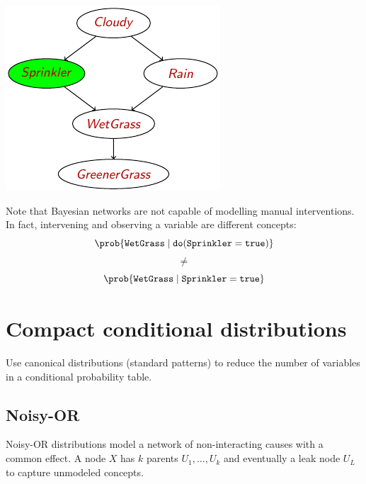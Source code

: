 \begin{description}
\begin{example}
            \begin{minipage}{.3\linewidth}
                \centering
                \includegraphics[width=\linewidth]{img/_do_operator_example2.pdf}
            \end{minipage}
            \begin{minipage}{.65\linewidth}
                Note that Bayesian networks are not capable of modelling manual interventions.
                In fact, intervening and observing a variable are different concepts:
                \[ \prob{\texttt{WetGrass} \mid \texttt{do}(\texttt{Sprinkler} = \texttt{true})} \]
                \[ \neq \]
                \[ \prob{\texttt{WetGrass} \mid \texttt{Sprinkler} = \texttt{true}} \]
            \end{minipage}
        \end{example}
\end{description}



\section{Compact conditional distributions}

Use canonical distributions (standard patterns) to reduce 
the number of variables in a conditional probability table.


\subsection{Noisy-OR}
Noisy-OR distributions model a network of non-interacting causes with a common effect.
A node $X$ has $k$ parents $U_1, \dots, U_k$ and eventually a leak node $U_L$ to capture unmodeled concepts. 

